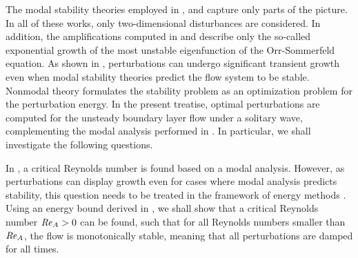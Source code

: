 \documentclass{jfm}
\newcommand\Rey{\mbox{\textit{Re}}}  %
\begin{document}
The modal stability theories employed in \citet{BlondeauxPralitsVittori2012},
\citet{VerschaevePedersen2014} and \citet{SadekParrasDiamessisLiu2015}
capture only parts of the picture. 
In all of these works, only two-dimensional disturbances are considered. In addition,
the amplifications computed in \citet{VerschaevePedersen2014}
and \citet{SadekParrasDiamessisLiu2015}
describe only the so-called exponential growth of the 
most unstable eigenfunction of the Orr-Sommerfeld equation. 
As shown in \citet{ButlerFarrell1992,TrefethenTrefethenReddyDriscoll1993,SchmidHenningson2001,Schmid2007},
perturbations can undergo significant transient growth even
when modal stability theories predict the flow system to
be stable. Nonmodal theory formulates the stability problem
as an optimization problem for the perturbation energy. 
In the present treatise, optimal perturbations
are computed for the unsteady boundary layer flow
under a solitary wave, complementing the modal
analysis performed in
\citep{BlondeauxPralitsVittori2012,VerschaevePedersen2014,SadekParrasDiamessisLiu2015}.
In particular, we shall investigate the following
questions. 

In \citet{SadekParrasDiamessisLiu2015}, a critical
Reynolds number is found based on a modal analysis.
However, as perturbations can display
growth even for cases where modal analysis predicts
stability, this question needs to be treated
in the framework of energy methods \citep{Joseph1966}. 
Using
an energy bound derived in \citep{DavisKerczek1973},
we shall show that a critical Reynolds number
$ \Rey_A > 0 $ can be found, 
such that for all Reynolds numbers smaller than $ \Rey_A $,
the flow is monotonically stable, meaning 
that all perturbations are damped for all times.
\end{document}
